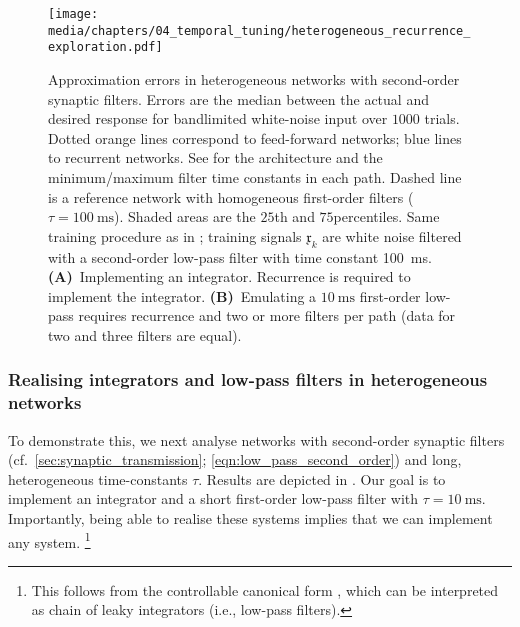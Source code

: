 \begin{figure}
	\centering
	\texttt{[image: media/chapters/04\_temporal\_tuning/heterogeneous\_recurrence\_exploration.pdf]}
	\caption[Approximation errors in heterogeneous networks with second-order synaptic filters]{Approximation errors in heterogeneous networks with second-order synaptic filters.
	Errors are the median \NRMSE between the actual and desired response for bandlimited white-noise input over $1000$ trials.
	Dotted orange lines correspond to feed-forward networks; blue lines to recurrent networks.
	See  for the architecture and the minimum/maximum filter time constants in each path.
	Dashed line is a reference network with homogeneous first-order filters ($\tau = \SI{100}{\milli\second}$).
	Shaded areas are the $25$th and $75$percentiles.
	Same training procedure as in ; training signals $\mathfrak{x}_k$ are white noise filtered with a second-order low-pass filter with time constant \SI{100}{\milli\second}.
	\textbf{(A)}~Implementing an integrator.
	Recurrence is required to implement the integrator.
	\textbf{(B)}~Emulating a $\SI{10}{\milli\second}$ first-order low-pass requires recurrence and two or more filters per path (data for two and three filters are equal).
	}
	\label{fig:heterogeneous_recurrence_exploration}
\end{figure}

\subsubsection{Realising integrators and low-pass filters in heterogeneous networks}
To demonstrate this, we next analyse networks with second-order synaptic filters (cf.~\cref{sec:synaptic_transmission}; \cref{eqn:low_pass_second_order}) and long, heterogeneous time-constants $\tau$.
Results are depicted in .
Our goal is to implement an integrator and a short first-order low-pass filter with $\tau = \SI{10}{\milli\second}$.
Importantly, being able to realise these systems implies that we can implement any \LTI system.%
\footnote{This follows from the controllable canonical form \citep[cf.][Section~3.4.4]{verhaegen2007filtering}, which can be interpreted as chain of leaky integrators (i.e., low-pass filters).}

